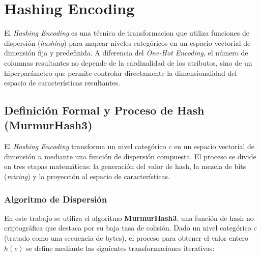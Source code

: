 \documentclass[a4paper,10pt]{book}
\begin{document}
	\section{Hashing Encoding}
		
		El \textit{Hashing Encoding} es una técnica de transformacion que utiliza funciones de dispersión (\textit{hashing}) para mapear niveles categóricos en un espacio vectorial de dimensión fija y predefinida. A diferencia del \textit{One-Hot Encoding}, el número de columnas resultantes no depende de la cardinalidad de los atributos, sino de un hiperparámetro que permite controlar directamente la dimensionalidad del espacio de características resultantes.
	
		\subsection{Definición Formal y Proceso de Hash (MurmurHash3)}
		
		El \textit{Hashing Encoding} transforma un nivel categórico $c$ en un espacio vectorial de dimensión $n$ mediante una función de dispersión compuesta. El proceso se divide en tres etapas matemáticas: la generación del valor de hash, la mezcla de bits (\textit{mixing}) y la proyección al espacio de características.
		
		\subsubsection{Algoritmo de Dispersión}
		
		En este trabajo se utiliza el algoritmo \textbf{MurmurHash3}, una función de hash no criptográfica que destaca por su baja tasa de colisión. Dado un nivel categórico $c$ (tratado como una secuencia de bytes), el proceso para obtener el valor entero $h(c)$ se define mediante las siguientes transformaciones iterativas:
		
\end{document}
